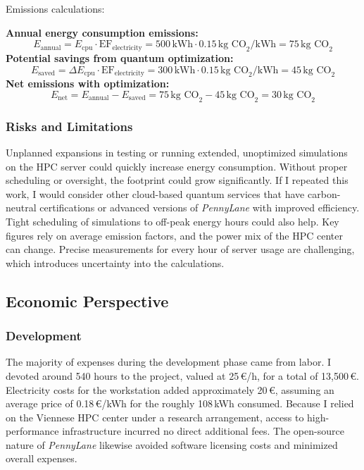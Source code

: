 Emissions calculations:
\begin{ProjectStructure}
    \textbf{Annual energy consumption emissions:}
    \[
    E_{\text{annual}} = E_{\text{cpu}} \cdot \text{EF}_{\text{electricity}} = 500 \, \text{kWh} \cdot 0.15 \, \text{kg CO}_2/\text{kWh} = 75 \, \text{kg CO}_2
    \]
    \textbf{Potential savings from quantum optimization:}
    \[
    E_{\text{saved}} = \Delta E_{\text{cpu}} \cdot \text{EF}_{\text{electricity}} = 300 \, \text{kWh} \cdot 0.15 \, \text{kg CO}_2/\text{kWh} = 45 \, \text{kg CO}_2
    \]
    \textbf{Net emissions with optimization:}
    \[
    E_{\text{net}} = E_{\text{annual}} - E_{\text{saved}} = 75 \, \text{kg CO}_2 - 45 \, \text{kg CO}_2 = 30 \, \text{kg CO}_2
    \]
\end{ProjectStructure} 
\subsubsection{Risks and Limitations}
Unplanned expansions in testing or running extended, unoptimized simulations on the HPC server could quickly increase energy consumption. Without proper scheduling or oversight, the footprint could grow significantly.
If I repeated this work, I would consider other cloud-based quantum services that have carbon-neutral certifications or advanced versions of \emph{PennyLane} with improved efficiency. Tight scheduling of simulations to off-peak energy hours could also help.
Key figures rely on average emission factors, and the power mix of the HPC center can change. Precise measurements for every hour of server usage are challenging, which introduces uncertainty into the calculations.


\subsection{Economic Perspective}

\subsubsection{Development}
The majority of expenses during the development phase came from labor. I devoted around 540 hours to the project, valued at 25\,\euro/h, for a total of 13{,}500\,\euro. Electricity costs for the workstation added approximately 20\,\euro, assuming an average price of 0.18\,\euro/kWh for the roughly 108\,kWh consumed. Because I relied on the Viennese HPC center under a research arrangement, access to high-performance infrastructure incurred no direct additional fees. The open-source nature of \emph{PennyLane} likewise avoided software licensing costs and minimized overall expenses.

